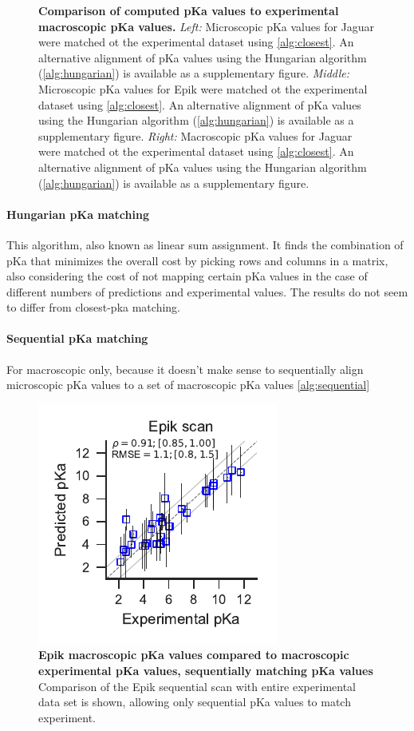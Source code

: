 \documentclass[9pt,lineno,final]{elife}
\begin{document}
\begin{figure}[hbtp]
\caption{{\bf Comparison of computed pKa values to experimental macroscopic pKa values.} {\it Left:} Microscopic pKa values for Jaguar were matched ot the experimental dataset using \cref{alg:closest}. An alternative alignment of pKa values using the Hungarian algorithm (\cref{alg:hungarian}) is available as a supplementary figure.
{\it Middle:} Microscopic pKa values for Epik were matched ot the experimental dataset using \cref{alg:closest}. An alternative alignment of pKa values using the Hungarian algorithm (\cref{alg:hungarian}) is available as a supplementary figure.
{\it Right:} Macroscopic pKa values for Jaguar were matched ot the experimental dataset using \cref{alg:closest}. An alternative alignment of pKa values using the Hungarian algorithm (\cref{alg:hungarian}) is available as a supplementary figure. \label{correlation-closest}}


\end{figure}

%
\paragraph{Hungarian pKa matching}
This algorithm, also known as linear sum assignment.
%
It finds the combination of pKa that minimizes the overall cost by picking rows and columns in a matrix, also considering the cost of not mapping certain pKa values in the case of different numbers of predictions and experimental values.
%
The results do not seem to differ from closest-pka matching.

\paragraph{Sequential pKa matching}

For macroscopic only, because it doesn't make sense to sequentially align microscopic pKa values to a set of macroscopic pKa values
\cref{alg:sequential}

\begin{figure}[hbtp]
	\centering
	\includegraphics[scale=1.2]{aligned_pka_epik_scan.pdf}	
	\caption{{\bf Epik macroscopic pKa values compared to macroscopic experimental pKa values, sequentially matching pKa values}
		Comparison of the Epik sequential scan with entire experimental data set is shown, allowing only sequential pKa values to match experiment.\label{fig:correlation-sequential}}
\end{figure}
    
\end{document}
